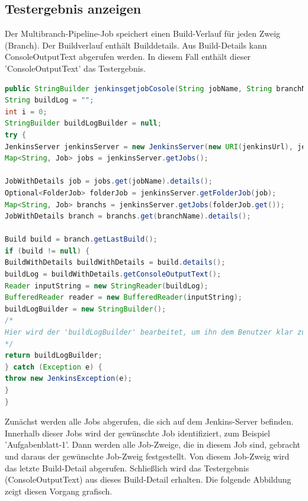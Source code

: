 \documentclass[a4paper,12pt,oneside]{book}
\begin{document}
\subsection{Testergebnis anzeigen}
 Der Multibranch-Pipeline-Job speichert einen Build-Verlauf für jeden Zweig (Branch). Der Buildverlauf enthält Builddetails. Aus Build-Details kann ConsoleOutputText abgerufen werden. In diesem Fall enthält dieser 'ConsoleOutputText' das Testergebnis.
 \begin{lstlisting}[language=JAVA,caption=Testergebnis Anfrage ]
public StringBuilder jenkinsgetjobCosole(String jobName, String branchName ) throws JenkinsException {
String buildLog = "";
int i = 0;
StringBuilder buildLogBuilder = null;
try {
JenkinsServer jenkinsServer = new JenkinsServer(new URI(jenkinsUrl), jenkinsUser, jenkinsPassword);
Map<String, Job> jobs = jenkinsServer.getJobs();

JobWithDetails job = jobs.get(jobName).details();
Optional<FolderJob> folderJob = jenkinsServer.getFolderJob(job);
Map<String, Job> branchs = jenkinsServer.getJobs(folderJob.get());
JobWithDetails branch = branchs.get(branchName).details();

Build build = branch.getLastBuild();
if (build != null) {
BuildWithDetails buildWithDetails = build.details();
buildLog = buildWithDetails.getConsoleOutputText();
Reader inputString = new StringReader(buildLog);
BufferedReader reader = new BufferedReader(inputString);
buildLogBuilder = new StringBuilder();  
/*
Hier wird der 'buildLogBuilder' bearbeitet, um ihn dem Benutzer klar zu zeigen.
*/
return buildLogBuilder;
} catch (Exception e) {
throw new JenkinsException(e);
}
}
 \end{lstlisting}
 Zunächst werden alle Jobs abgerufen, die sich auf dem Jenkins-Server befinden. Innerhalb dieser Jobs wird der gewünschte Job identifiziert, zum Beispiel 'Aufgabenblatt-1'. Dann werden alle Job-Zweige, die in diesem Job sind, gebracht und daraus der gewünschte Job-Zweig festgestellt. Von diesem Job-Zweig wird das letzte Build-Detail abgerufen. Schließlich wird das Testergebnis (ConsoleOutputText) aus dieses Build-Detail erhalten. Die folgende Abbildung zeigt diesen Vorgang grafisch.
\end{document}
